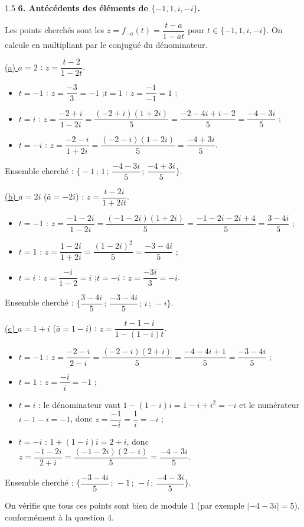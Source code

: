 \documentclass[12pt]{article}
\begin{document}
\begin{spacing}{1.5}
\textbf{6. Antécédents des éléments de $\{-1,1,i,-i\}$.}

Les points cherchés sont les $z=f_{-a}(t)=\dfrac{t-a}{1-\bar a t}$ pour $t\in\{-1,1,i,-i\}$. On calcule en multipliant par le conjugué du dénominateur.

\underline{(a) $a=2$} : $z=\dfrac{t-2}{1-2t}$.
\begin{itemize}
\item $t=-1$ : $z=\dfrac{-3}{3}=-1$ ;\quad $t=1$ : $z=\dfrac{-1}{-1}=1$ ;
\item $t=i$ : $z=\dfrac{-2+i}{1-2i}=\dfrac{(-2+i)(1+2i)}{5}=\dfrac{-2-4i+i-2}{5}=\dfrac{-4-3i}{5}$ ;
\item $t=-i$ : $z=\dfrac{-2-i}{1+2i}=\dfrac{(-2-i)(1-2i)}{5}=\dfrac{-4+3i}{5}$.
\end{itemize}
Ensemble cherché : $\Big\{-1\,;\,1\,;\,\dfrac{-4-3i}{5}\,;\,\dfrac{-4+3i}{5}\Big\}$.

\underline{(b) $a=2i$} ($\bar a=-2i$) : $z=\dfrac{t-2i}{1+2it}$.
\begin{itemize}
\item $t=-1$ : $z=\dfrac{-1-2i}{1-2i}=\dfrac{(-1-2i)(1+2i)}{5}=\dfrac{-1-2i-2i+4}{5}=\dfrac{3-4i}{5}$ ;
\item $t=1$ : $z=\dfrac{1-2i}{1+2i}=\dfrac{(1-2i)^2}{5}=\dfrac{-3-4i}{5}$ ;
\item $t=i$ : $z=\dfrac{-i}{1-2}=i$ ;\quad $t=-i$ : $z=\dfrac{-3i}{3}=-i$.
\end{itemize}
Ensemble cherché : $\Big\{\dfrac{3-4i}{5}\,;\,\dfrac{-3-4i}{5}\,;\,i\,;\,-i\Big\}$.

\underline{(c) $a=1+i$} ($\bar a=1-i$) : $z=\dfrac{t-1-i}{1-(1-i)t}$.
\begin{itemize}
\item $t=-1$ : $z=\dfrac{-2-i}{2-i}=\dfrac{(-2-i)(2+i)}{5}=\dfrac{-4-4i+1}{5}=\dfrac{-3-4i}{5}$ ;
\item $t=1$ : $z=\dfrac{-i}{i}=-1$ ;
\item $t=i$ : le dénominateur vaut $1-(1-i)i=1-i+i^2=-i$ et le numérateur $i-1-i=-1$, donc $z=\dfrac{-1}{-i}=\dfrac1i=-i$ ;
\item $t=-i$ : $1+(1-i)i=2+i$, donc $z=\dfrac{-1-2i}{2+i}=\dfrac{(-1-2i)(2-i)}{5}=\dfrac{-4-3i}{5}$.
\end{itemize}
Ensemble cherché : $\Big\{\dfrac{-3-4i}{5}\,;\,-1\,;\,-i\,;\,\dfrac{-4-3i}{5}\Big\}$.

On vérifie que tous ces points sont bien de module $1$ (par exemple $|{-4-3i}|=5$), conformément à la question 4.


\end{spacing}
\end{document}
